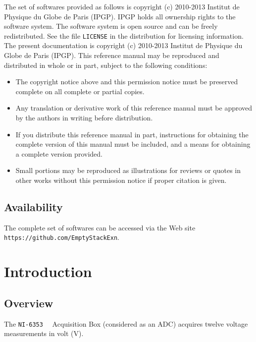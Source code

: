 \documentclass[a4paper]{report}
\begin{document}
The set of softwares provided as follows is copyright (c) 2010-2013 Institut de Physique du Globe de Paris (IPGP). IPGP holds all ownership rights to the software system.
The software system is open source and can be freely redistributed. See the file \verb!LICENSE! in the distribution for licensing information.
The present documentation is copyright (c) 2010-2013 Institut de Physique du Globe de Paris (IPGP). This reference manual may be reproduced and distributed in whole or in part, subject to the following conditions:
\begin{itemize}
\item The copyright notice above and this permission notice must be preserved complete on all complete or partial copies.
\item Any translation or derivative work of this reference manual must be approved by the authors in writing before distribution.
\item If you distribute this reference manual in part, instructions for obtaining the complete version of this manual must be included, and a means for obtaining a complete version provided.
\item Small portions may be reproduced as illustrations for reviews or quotes in other works without this permission notice if proper citation is given.
\end{itemize}

\section{Availability}

The complete set of softwares can be accessed via the Web site \verb!https://github.com/EmptyStackExn!.

\chapter{Introduction}
\label{sec:intro}
\section{Overview}

The \texttt{NI-6353}~\cite{NI_6353_datasheet}~\cite{NI_calibration_procedure} Acquisition Box (considered as an ADC) acquires twelve voltage measurements in volt (V).
\end{document}
